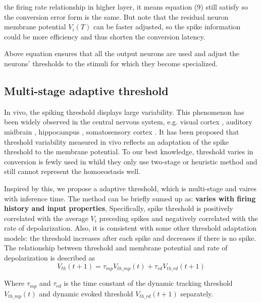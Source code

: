 \documentclass{article}
\begin{document}
the firing rate relationship in higher layer, it means equation (9) still satisfy so the conversion error form is the same.
But note that the residual neuron membrane potential $V_i(T)$ can be faster adjusted, so the spike information could be more efficiency and thus shorten the conversion latency. 

Above equation ensures that all the output neurons are used and adjust the neurons' thresholds to the stimuli for which they become specialized. 

\subsection{Multi-stage adaptive threshold}

In vivo, the spiking threshold displays large variability. This phenomenon has been widely observed in
the central nervous system, e.g. visual cortex \cite{azouz2000dynamic, azouz2003adaptive}, auditory
midbrain \cite{pena2002postsynaptic}, hippocampus \cite{henze2001action}, somatosensory cortex \cite{wilent2005stimulus}. It has
been proposed that threshold variability measured in vivo reflects
an adaptation of the spike threshold to the membrane potential. To our best knowledge, threshold varies in conversion is fewly used in \cite{kim2020towards,chen2022adaptive,li2021free} whild they only use two-stage or heuristic method and still cannot represent the homoeostasis well.

Inspired by this, we propose a adaptive threshold, which is multi-stage and vaires with inference time.
The method can be briefly sumed up as: \textbf{varies with firing history and input properties},
Specifically, spike threshold is positively correlated with the average $V_i$ preceding spikes and negatively correlated with the rate of depolarization. Also, it is consistent with some
other threshold adaptation models: the threshold increases after each spike and decreases if there is no spike.
The relationship between threshold and membrane potential and rate of depolarization is described as
\begin{equation}
  V_{th}(t+1) = \tau_{mp}V_{th\_mp}(t) + \tau_{rd}V_{th\_rd}(t+1)
\end{equation}

Where $\tau_{mp}$ and $\tau_{rd}$ is the time constant of the dynamic tracking threshold $V_{th\_mp}(t)$ and dynamic evoked threshold $V_{th\_rd}(t+1)$ separately.
\end{document}
